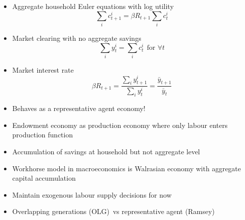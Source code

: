 \documentclass[notes=show]{beamer}
\begin{document}
\begin{frame}%


\begin{itemize}
\item Aggregate household Euler equations with log utility%
\begin{equation*}
\sum_{i}c_{t+1}^{i}=\beta R_{t+1}\sum_{i}c_{t}^{i}
\end{equation*}

\item Market clearing with no aggregate savings%
\begin{equation*}
\sum_{i}y_{t}^{i}=\sum_{i}c_{t}^{i}\ \ \text{for }\forall t
\end{equation*}

\item Market interest rate%
\begin{equation*}
\beta R_{t+1}=\frac{\sum_{i}y_{t+1}^{i}}{\sum_{i}y_{t}^{i}}=\frac{\bar{y}%
_{t+1}}{\bar{y}_{t}}
\end{equation*}

\item Behaves as a representative agent economy!
\end{itemize}

\transboxout%
\end{frame}%

\begin{frame}%


\begin{itemize}
\item Endowment economy as production economy where only labour enters
production function

\item Accumulation of savings at household but not aggregate level

\item Workhorse model in macroeconomics is Walrasian economy with aggregate
capital accumulation

\item Maintain exogenous labour supply decisions for now

\item Overlapping generations (OLG)\ vs representative agent (Ramsey)
\end{itemize}

\transboxout%
\end{frame}%
\end{document}
